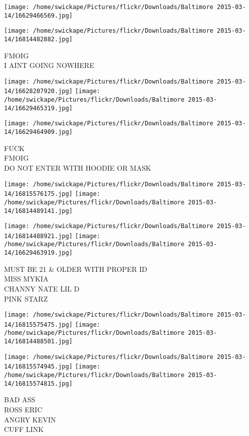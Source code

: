 \documentclass[10pt,letterpaper]{article}
\begin{document}
\texttt{[image: /home/swickape/Pictures/flickr/Downloads/Baltimore 2015-03-14/16629466569.jpg]}

\vspace{0.25in}
\texttt{[image: /home/swickape/Pictures/flickr/Downloads/Baltimore 2015-03-14/16814482882.jpg]}

FMOIG\\
I AINT GOING NOWHERE\\
\pagebreak

\texttt{[image: /home/swickape/Pictures/flickr/Downloads/Baltimore 2015-03-14/16628207920.jpg]}
\texttt{[image: /home/swickape/Pictures/flickr/Downloads/Baltimore 2015-03-14/16629465319.jpg]}

\vspace{0.25in}
\texttt{[image: /home/swickape/Pictures/flickr/Downloads/Baltimore 2015-03-14/16629464909.jpg]}

FUCK\\
FMOIG\\
DO NOT ENTER WITH HOODIE OR MASK\\
\pagebreak

\texttt{[image: /home/swickape/Pictures/flickr/Downloads/Baltimore 2015-03-14/16815576175.jpg]}
\texttt{[image: /home/swickape/Pictures/flickr/Downloads/Baltimore 2015-03-14/16814489141.jpg]}

\texttt{[image: /home/swickape/Pictures/flickr/Downloads/Baltimore 2015-03-14/16814488921.jpg]}
\texttt{[image: /home/swickape/Pictures/flickr/Downloads/Baltimore 2015-03-14/16629463919.jpg]}

MUST BE 21 \& OLDER WITH PROPER ID\\
MISS MYKIA\\
CHANNY NATE LIL D\\
PINK STARZ\\
\pagebreak

\texttt{[image: /home/swickape/Pictures/flickr/Downloads/Baltimore 2015-03-14/16815575475.jpg]}
\texttt{[image: /home/swickape/Pictures/flickr/Downloads/Baltimore 2015-03-14/16814488501.jpg]}

\texttt{[image: /home/swickape/Pictures/flickr/Downloads/Baltimore 2015-03-14/16815574945.jpg]}
\texttt{[image: /home/swickape/Pictures/flickr/Downloads/Baltimore 2015-03-14/16815574815.jpg]}

BAD ASS\\
ROSS ERIC\\
ANGRY KEVIN\\
CUFF LINK\\
\pagebreak
\end{document}
